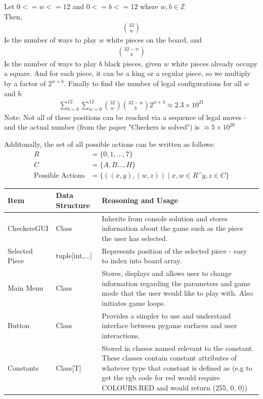 \documentclass{article}
\makeatletter
\newcommand\subsubsubsection{\@startsection{paragraph}{4}{\z@}{-2.5ex\@plus -1ex \@minus -.25ex}{1.25ex \@plus .25ex}{\normalfont\normalsize\bfseries}}
\makeatother
\begin{document}
    \noindent Let $0 <= w <= 12$ and $0 <= b <= 12$  where $w,b \in \mathbb{Z}$\\
    Then,
    \begin{align}
        {32}\choose{w}
    \end{align}
    Is the number of ways to play $w$ white pieces on the board, and
    \begin{align}
        {32-w}\choose{b}
    \end{align}
    Is the number of ways to play $b$ black pieces, given $w$ white pieces already occupy a square.
    And for each piece, it can be a king or a regular piece, so we multiply by a factor of $2^{w+b}$.
    Finally to find the number of legal configurations for all $w$ and $b$:
    \begin{align}
        \sum_{b=0}^{12}\sum_{w=0}^{12} {{32}\choose{w}} {{32-w}\choose{b}} 2^{w+b} \approx 2.3\times10^{21}
    \end{align}
    Note: Not all of these positions can be reached via a sequence of legal moves - and the actual number (from
    the paper "Checkers is solved") is $\approx 5 \times 10^{20}$

    Additonally, the set of all possible actions can be written as follows:
    \begin{align}
        R &= \{0,1, ... ,7\}\\
        C &= \{A, B ..., H\}\\
        \text{Possible Actions} &= \{((x,y), (w,z)) \mid x, w \in R \text{^} y,z \in C\}
    \end{align}

    \subsubsubsection{GUI Add-on}
    \begin{center}
        \begin{tabular}{|m{10em} | m{12em} | m{15em}|}
            \hline 
                Item & Data Structure & Reasoning and Usage \\
            \hline
            \hline
                CheckersGUI & Class & Inherits from console solution and stores information about the game such as the piece the user has selected. \\
            \hline
                Selected Piece & tuple[int,...] & Represents position of the selected piece - easy to index into board array. \\
            \hline
                Main Menu & Class & Stores, displays and allows user to change information regarding the parameters and game mode that the user would like to play with. Also initiates game loops.\\
            \hline
                Button & Class & Provides a simpler to use and understand interface between pygame surfaces and user interactions. \\
            \hline
                Constants & Class[T] & Stored in classes named relevant to the constant. These classes contain constant attributes of whatever type that constant is defined as (e.g to get the rgb code for red would require COLOURS.RED and would return (255, 0, 0)) \\
            \hline
        \end{tabular}
    \end{center}
\end{document}
